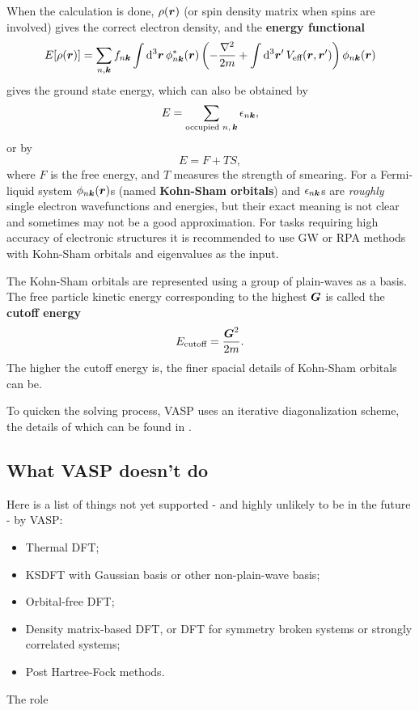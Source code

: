 \documentclass[hyperref, a4paper]{article}
\newcommand*{\concept}[1]{{\textbf{#1}}}
\begin{document}
When the calculation is done, $\rho(\vb*{r})$ (or spin density matrix when spins are involved) gives the correct electron density, and the \concept{energy functional}
\begin{equation}
    E[\rho(\vb*{r})] = \sum_{n, \vb*{k}} f_{n \vb*{k}} \int \dd[3]{\vb*{r}} \phi_{n \vb*{k}}^*(\vb*{r}) \left( - \frac{\laplacian}{2m  } + \int \dd[3]{\vb*{r}'} V_\text{eff}(\vb*{r}, \vb*{r}') \right) \phi_{n \vb*{k}}(\vb*{r}) 
\end{equation}
gives the ground state energy, which can also be obtained by
\begin{equation}
    E = \sum_\text{occupied $n, \vb*{k}$} \epsilon_{n \vb*{k}},
\end{equation}
or by 
\begin{equation}
    E = F + TS,
\end{equation}
where $F$ is the free energy, and $T$ measures the strength of smearing.
For a Fermi-liquid system $\phi_{n \vb*{k}}(\vb*{r})$s (named \concept{Kohn-Sham orbitals}) and $\epsilon_{n \vb*{k}}$s are \emph{roughly} single electron wavefunctions and energies, but their exact meaning is not clear and sometimes may not be a good approximation.
For tasks requiring high accuracy of electronic structures it is recommended to use GW or RPA methods with Kohn-Sham orbitals and eigenvalues as the input.

The Kohn-Sham orbitals are represented using a group of plain-waves as a basis.
The free particle kinetic energy corresponding to the highest $\vb*{G}$ is called the \concept{cutoff energy}
\begin{equation}
    E_\text{cutoff} = \frac{\vb*{G}^2}{2m}.
\end{equation}
The higher the cutoff energy is, the finer spacial details of Kohn-Sham orbitals can be.

To quicken the solving process, VASP uses an iterative diagonalization scheme, the details of which can be found in \cite{groundstate}.

\subsection{What VASP doesn't do}

Here is a list of things not yet supported - and highly unlikely to be in the future - by VASP:
\begin{itemize}
    \item Thermal DFT;
    \item KSDFT with Gaussian basis or other non-plain-wave basis;
    \item Orbital-free DFT;
    \item Density matrix-based DFT, or DFT for symmetry broken systems or strongly correlated systems;
    \item Post Hartree-Fock methods.
\end{itemize}
The role 
\end{document}

